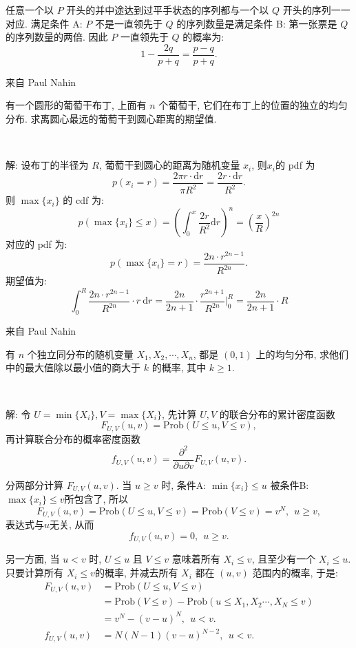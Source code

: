 任意一个以 $P$ 开头的并中途达到过平手状态的序列都与一个以 $Q$ 开头的序列一一对应. 满足条件 A: $P$ 不是一直领先于 $Q$ 的序列数量是满足条件 B: 第一张票是 $Q$ 的序列数量的两倍. 因此 $P$ 一直领先于 $Q$ 的概率为:
\[1 - \frac{2q}{p+q} = \frac{p-q}{p+q} .\]


\newpage 

\noindent 来自 Paul Nahin 

有一个圆形的葡萄干布丁, 上面有 $n$ 个葡萄干, 它们在布丁上的位置的独立的均匀分布. 求离圆心最远的葡萄干到圆心距离的期望值.

~

解: 设布丁的半径为 $R$, 葡萄干到圆心的距离为随机变量 $x_i$, 则$x_i$的 pdf 为
\[p(x_i=r) = \frac{2\pi r\cdot\mathrm{d}r}{\pi R^2} = \frac{2r\cdot\mathrm{d}r}{R^2}.\]
则 $\max\{x_i\}$ 的 cdf 为:
\[p(\max\{x_i\} \le x) = \left( \int_0^x{\frac{2r}{R^2} \mathrm{d}r}\right)^n = \left(\frac{x}{R}\right)^{2n}\]
对应的 pdf 为: 
\[p(\max\{x_i\} = r) = \frac{2n\cdot r^{2n-1}}{R^{2n}} .\]
期望值为:
\[\int_0^R{\frac{2n\cdot r^{2n-1}}{R^{2n}}\cdot r}\ \mathrm{d}r = \frac{2n}{2n+1}\cdot \frac{r^{2n+1}}{R^{2n}}\bigg|_0^R = \frac{2n}{2n+1}\cdot R\]



\newpage

\noindent 来自 Paul Nahin

有 $n$ 个独立同分布的随机变量 $X_1, X_2, \cdots, X_n$, 都是 $(0,1)$ 上的均匀分布, 求他们中的最大值除以最小值的商大于 $k$ 的概率, 其中 $k \ge 1$.

~

解: 令 $U = \min\{X_i\}, V = \max\{X_i\}$, 先计算 $U,V$ 的联合分布的累计密度函数 
$$F_{U,V}(u,v) = \mathrm{Prob}(U\le u, V\le v) ,$$ 
再计算联合分布的概率密度函数 
$$f_{U,V}(u,v) = \frac{\partial^2}{\partial u\partial v}F_{U,V}(u,v). $$

分两部分计算 $F_{U,V}(u,v)$. 当 $u\ge v$ 时, 条件A: $\min\{x_i\}\le u$ 被条件B: $\max\{x_i\}\le v$所包含了, 所以 
$$F_{U,V}(u,v) = \mathrm{Prob}(U\le u, V\le v) = \mathrm{Prob}(V\le v) = v^N,\ \ u\ge v , $$ 
表达式与$u$无关, 从而
$$f_{U,V}(u,v) = 0,\ \ u\ge v .$$

另一方面, 当 $u < v$ 时, $U\le u$ 且 $V\le v$ 意味着所有 $X_i \le v$, 且至少有一个 $X_i \le u$. 只要计算所有 $X_i \le v$的概率, 并减去所有 $X_i$ 都在 $(u,v)$ 范围内的概率, 于是:
\begin{align*}
F_{U,V}(u,v) &= \mathrm{Prob}(U\le u, V\le v) \\
&= \mathrm{Prob}(V\le v) - \mathrm{Prob}(u\le X_1,X_2\cdots,X_N\le v) \\
&= v^N - (v-u)^N,\ \ u < v.\\
f_{U,V}(u,v) &= N(N-1)(v-u)^{N-2}, \ \ u < v.
\end{align*}

